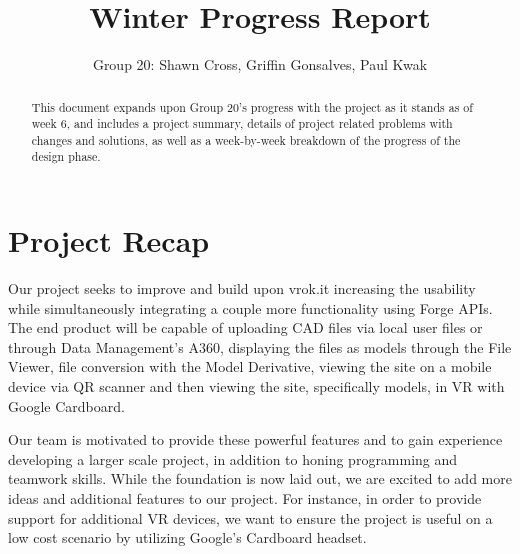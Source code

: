 \documentclass[10pt,draftclsnofoot,onecolumn]{IEEEtran}
\begin{document}
\title{Winter Progress Report}
\author{Group 20: Shawn Cross, Griffin Gonsalves, Paul Kwak}
\maketitle
\hspace*{\fill}\hspace*{\fill}
\vspace{2cm}
\begin{abstract}
This document expands upon Group 20's progress with the project as it stands as of week 6, and includes a project summary, details of project related problems with changes and solutions, as well as a week-by-week breakdown of the progress of the design phase. 
\end{abstract}
\IEEEpeerreviewmaketitle

\newpage
{}

\section{Project Recap}
Our project seeks to improve and build upon vrok.it increasing the usability while simultaneously integrating a couple more functionality using Forge APIs. The end product will be capable of uploading CAD files via local user files or through Data Management’s A360, displaying the files as models through the File Viewer, file conversion with the Model Derivative, viewing the site on a mobile device via QR scanner and then viewing the site, specifically models, in VR with Google Cardboard.

Our team is motivated to provide these powerful features and to gain experience developing a larger scale project, in addition to honing programming and teamwork skills. While the foundation is now laid out, we are excited to add more ideas and additional features to our project. For instance, in order to provide support for additional VR devices, we want to ensure the project is useful on a low cost scenario by utilizing Google's Cardboard headset.
\end{document}
